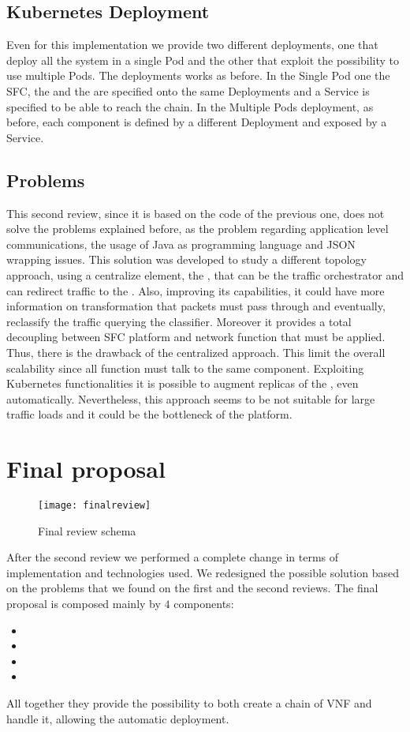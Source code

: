 \subsection{Kubernetes Deployment}
Even for this implementation we provide two different deployments, one that
deploy all the system in a single Pod and the other that exploit the possibility
to use multiple Pods. The deployments works as before. In the Single Pod one the
SFC, the \enchainer{} and the \dispatcher{} are specified onto the same
Deployments and a Service is specified to be able to reach the chain. In the
Multiple Pods deployment, as before, each component is defined by a different
Deployment and exposed by a Service.

\subsection{Problems}
This second review, since it is based on the code of the previous one, does not
solve the problems explained before, as the problem regarding application
level communications, the usage of Java as programming language and JSON
wrapping issues. This solution was developed to study a different topology
approach, using a centralize element, the \dispatcher{}, that can be the traffic
orchestrator and can redirect traffic to the \vnfs{}. Also, improving its
capabilities, it could have more information on transformation that packets must
pass through and eventually, reclassify the traffic querying the classifier.
Moreover it provides a total decoupling between SFC platform and network
function that must be applied. Thus, there is the drawback of the centralized
approach. This limit the overall scalability since all function must talk to the
same component. Exploiting Kubernetes functionalities it is possible to augment
replicas of the \dispatcher{}, even automatically. Nevertheless, this approach
seems to be not suitable for large traffic loads and it could be the bottleneck
of the platform.

\section{Final proposal}

\begin{figure}
  \centering
  \texttt{[image: finalreview]}
  \caption{Final review schema}
  \label{chap:impl:img:finalreview}
\end{figure}

After the second review we performed a complete change in terms of
implementation and technologies used. We redesigned the possible solution based
on the problems that we found on the first and the second reviews. The final
proposal is composed mainly by $4$ components:
\begin{itemize}
  \item \astaire{}
  \item \harbor{}
  \item \ironhide{}
  \item \roulette{}
\end{itemize}
All together they provide the possibility to both create a chain of VNF and
handle it, allowing the automatic deployment.

